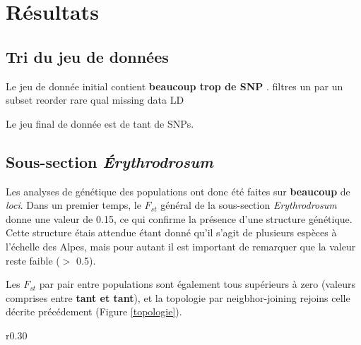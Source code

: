\section{Résultats}

\subsection{Tri du jeu de données}

Le jeu de donnée initial contient \textbf{beaucoup trop de SNP} .
filtres un par un 
subset reorder 
rare 
qual 
missing data 
LD 

Le jeu final de donnée est de tant de SNPs.


\subsection{Sous-section \textit{Érythrodrosum}}

Les analyses de génétique des populations ont donc été faites sur \textbf{beaucoup} de \textit{loci}. Dans un premier temps, le $F_{st}$ général de la sous-section \textit{Erythrodrosum} donne une valeur de 0.15, ce qui confirme la présence d'une structure génétique. Cette structure étais attendue étant donné qu'il s'agit de plusieurs espèces à l'échelle des Alpes, mais pour autant il est important de remarquer que la valeur reste faible ($>$ 0.5).



Les $F_{st}$ par pair entre populations sont également tous supérieurs à zero (valeurs comprises entre \textbf{tant et tant}), et la topologie par neigbhor-joining rejoins celle décrite précédement (Figure \ref{topologie}).

\begin{wrapfigure}{r}{0.30\textwidth}
	\vspace{-40pt}
	\begin{center}
	\end{center}
	\vspace{-20pt}
	\caption{\textbf{Topologie} faite avec les $F_{st}$}
    \label{topologie}
\end{wrapfigure}

